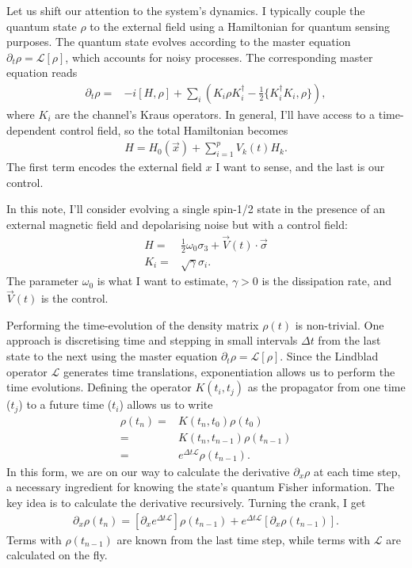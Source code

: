 \documentclass[12pt]{article}
\begin{document}
Let us shift our attention to the system's dynamics. I typically couple the quantum state $\rho$ to the external field using a Hamiltonian for quantum sensing purposes. The quantum state evolves according to the master equation $\partial_t \rho = \mathcal{L}[\rho]$, which accounts for noisy processes. The corresponding master equation reads
\begin{align}
    \partial_t \rho = & - i [H, \rho] + \sum_{i}\left( K_i \rho K_i^\dagger - \frac{1}{2}\{K_i^\dagger K_i, \rho \}\right),
\end{align}
where $K_i$ are the channel's Kraus operators. In general, I'll have access to a time-dependent control field, so the total Hamiltonian becomes
\begin{align}
H = H_0(\vec{x}) + \sum_{i=1}^{p} V_k(t) H_k.
\end{align}
The first term encodes the external field $x$ I want to sense, and the last is our control.  

In this note, I'll consider evolving a single spin-1/2 state in the presence of an external magnetic field and depolarising noise but with a control field:
\begin{align}
    H = & \frac{1}{2} \omega_0 \sigma_3 + \vec{V}(t) \cdot \vec{\sigma}\\
    K_i = & \sqrt{\gamma} \sigma_i.
\end{align}
The parameter $\omega_0$ is what I want to estimate, $\gamma>0$ is the dissipation rate, and $\vec{V}(t)$ is the control.

Performing the time-evolution of the density matrix $\rho(t)$ is non-trivial. One approach is discretising time and stepping in small intervals $\Delta t$ from the last state to the next using the master equation $\partial_t \rho = \mathcal{L}[\rho]$. Since the Lindblad operator $\mathcal{L}$ generates time translations, exponentiation allows us to perform the time evolutions. Defining the operator $K(t_i, t_j)$ as the propagator from one time ($t_j$) to a future time ($t_i$) allows us to write
\begin{align}
    \rho(t_n) = & K(t_n, t_0) \rho(t_0)\\
    = & K(t_n, t_{n-1}) \rho(t_{n-1})\\
    = & e^{\Delta t \mathcal{L}} \rho(t_{n-1}).
\end{align}
In this form, we are on our way to calculate the derivative $\partial_x \rho$ at each time step, a necessary ingredient for knowing the state's quantum Fisher information. The key idea is to calculate the derivative recursively. Turning the crank, I get
\begin{align}
    \partial_x \rho(t_n) = \left[ \partial_x e^{\Delta t \mathcal{L}} \right] \rho(t_{n-1}) + e^{\Delta t \mathcal{L}} \left[ \partial_x \rho(t_{n-1})\right].
\end{align}
Terms with $\rho(t_{n-1})$ are known from the last time step, while terms with $\mathcal{L}$ are calculated on the fly. 
\end{document}
